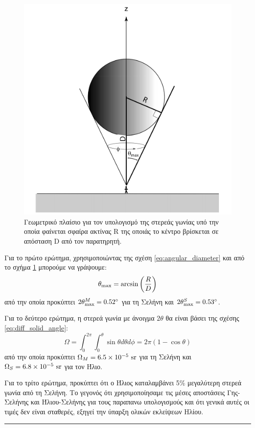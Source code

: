 \begin{figure}[h]
    \centering
    \includegraphics[scale=0.5]{Figures/solid_angle_problem.png}
    \caption{Γεωμετρικό πλαίσιο για τον υπολογισμό της στερεάς γωνίας υπό την οποία φαίνεται σφαίρα ακτίνας R της οποιάς το κέντρο βρίσκεται σε απόσταση D από τον παρατηρητή.}
    \label{fig:solid_angle_problem}
\end{figure}

Για το πρώτο ερώτημα, χρησιμοποιώντας της σχέση \eqref{eq:angular_diameter} και από το σχήμα \ref{fig:solid_angle_problem} μπορούμε να γράψουμε:
$$\theta_{\rm max} = \arcsin \left( \frac{R}{D} \right)$$ από την οποία προκύπτει $2\theta_{\rm max}^{M} = 0.52^{\circ}$ για τη Σελήνη και $2\theta_{\rm max}^{S} = 0.53^{\circ}$.

Για το δεύτερο ερώτημα, η στερεά γωνία με άνοιγμα $2\theta$ θα είναι βάσει της σχέσης \eqref{eq:diff_solid_angle}:
$$\Omega = \int_{0}^{2\pi} \int_{0}^{\theta} \sin \theta d \theta d \phi = 2\pi (1 - \cos \theta)$$ από την οποία προκύπτει $\Omega_M = 6.5 \times 10^{-5} \ \rm sr$ για τη Σελήνη και $\Omega_S = 6.8 \times 10^{-5} \ \rm sr$ για τον Ήλιο.

Για το τρίτο ερώτημα, προκύπτει ότι ο Ήλιος καταλαμβάνει 5\% μεγαλύτερη στερεά γωνία από τη Σελήνη. Το γεγονός ότι χρησιμοποίησαμε τις μέσες αποστάσεις Γης-Σελήνης και Ήλιου-Σελήνης για τους παραπανω υπολογισμούς και ότι γενικά αυτές οι τιμές δεν είναι σταθερές, εξηγεί την ύπαρξη ολικών εκλείψεων Ηλίου.\\
{\hrule}


